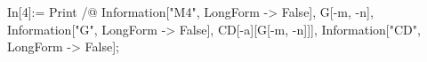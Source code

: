 In[4]:= Print /@ {Information["M4", LongForm -> False], G[-m, -n], Information["G", LongForm -> False], CD[-a][G[-m, -n]]], Information["CD", LongForm -> False]}; 